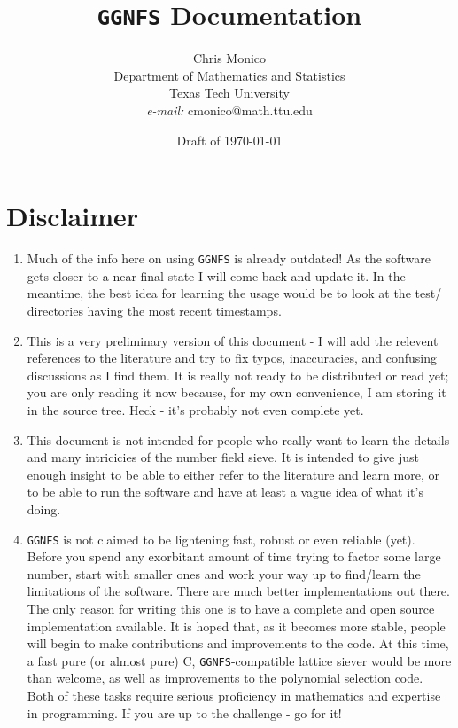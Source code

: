 \documentclass[12pt]{article}
\title{{\tt GGNFS} Documentation
}
\date{Draft of \today}%
\author{Chris Monico \\
  {\small Department of Mathematics and Statistics\vspace{-2mm}}\\
  {\small Texas Tech University\vspace{-2mm}}\\
  {\small {\em e-mail:\/} cmonico@math.ttu.edu }
  }
\begin{document}
\maketitle

\tableofcontents

\newpage
\section{Disclaimer}
  \begin{enumerate}
    \item
      Much of the info here on using {\tt GGNFS} is already outdated!
      As the software gets closer to a near-final state I will 
      come back and update it. In the meantime, the best idea
      for learning the usage would be to look at the test/ directories
      having the most recent timestamps.
    \item
      This is a very preliminary version of this document - 
      I will add the relevent references to the literature
      and try to fix typos, inaccuracies, and confusing
      discussions as I find them. It is really not ready
      to be distributed or read yet; you are only reading
      it now because, for my own convenience, I am storing it
      in the source tree. Heck - it's probably not even complete
      yet.
    \item 
      This document is not intended for people who really want
      to learn the details and many intricicies of the number field 
      sieve. It is intended to give just enough insight to be able
      to either refer to the literature and learn more, or to
      be able to run the software and have at least a vague idea
      of what it's doing.
    \item
      {\tt GGNFS} is not claimed to be lightening fast, robust
      or even reliable (yet). Before you spend any exorbitant
      amount of time trying to factor some large number, start
      with smaller ones and work your way up to find/learn
      the limitations of the software. There are much better
      implementations out there. The only reason for writing
      this one is to have a complete and open source implementation
      available. It is hoped that, as it becomes more stable,
      people will begin to make contributions and improvements
      to the code. At this time, a fast pure (or almost pure) C,
      {\tt GGNFS}-compatible lattice siever would be more than
      welcome, as well as improvements to the polynomial selection
      code. Both of these tasks require serious proficiency in
      mathematics and expertise in programming. If you are up to
      the challenge - go for it!
  \end{enumerate}
\end{document}
